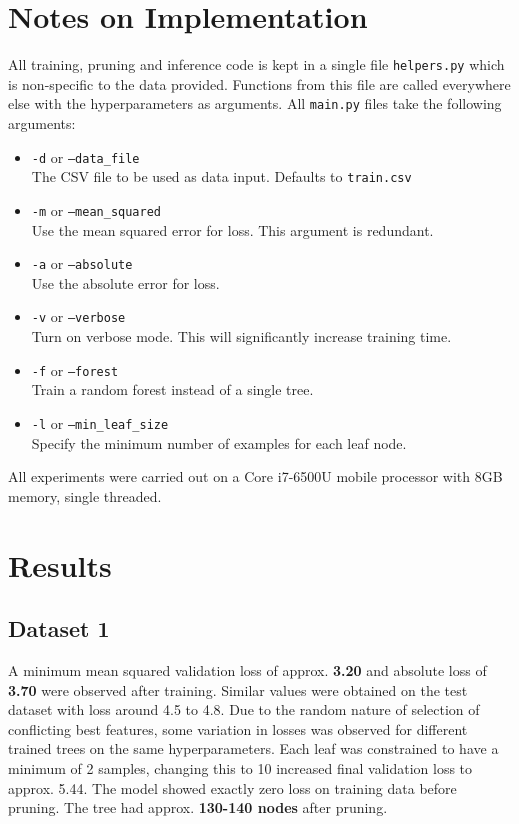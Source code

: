 \documentclass{article}
\begin{document}
\section{Notes on Implementation}
All training, pruning and inference code is kept in a single file \texttt{helpers.py} which is non-specific to the data provided. Functions from this file are called everywhere else with the hyperparameters as arguments. All \texttt{main.py} files take the following arguments:
\begin{itemize}
	\item \texttt{-d} or \texttt{--data\_file}\\
	The CSV file to be used as data input. Defaults to \texttt{train.csv}
	\item \texttt{-m} or \texttt{--mean\_squared}\\
	Use the mean squared error for loss. This argument is redundant.
	\item \texttt{-a} or \texttt{--absolute}\\
	Use the absolute error for loss.
	\item \texttt{-v} or \texttt{--verbose}\\
	Turn on verbose mode. This will significantly increase training time.
	\item \texttt{-f} or \texttt{--forest}\\
	Train a random forest instead of a single tree.
	\item \texttt{-l} or \texttt{--min\_leaf\_size}\\
	Specify the minimum number of examples for each leaf node.
\end{itemize}

All experiments were carried out on a Core i7-6500U mobile processor with 8GB memory, single threaded.

\newpage

\section{Results}
\subsection{Dataset 1}
A minimum mean squared validation loss of approx. \textbf{3.20} and absolute loss of \textbf{3.70} were observed after training. Similar values were obtained on the test dataset with loss around 4.5 to 4.8. Due to the random nature of selection of conflicting best features, some variation in losses was observed for different trained trees on the same hyperparameters. Each leaf was constrained to have a minimum of 2 samples, changing this to 10 increased final validation loss to approx. 5.44. The model showed exactly zero loss on training data before pruning. The tree had approx. \textbf{130-140 nodes} after pruning.
\end{document}
